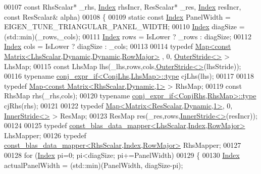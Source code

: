 \begin{DoxyCode}
00107         \textcolor{keyword}{const} RhsScalar* \_rhs, \hyperlink{namespace_eigen_a62e77e0933482dafde8fe197d9a2cfde}{Index} rhsIncr, ResScalar* \_res, \hyperlink{namespace_eigen_a62e77e0933482dafde8fe197d9a2cfde}{Index} resIncr, \textcolor{keyword}{const} ResScalar& 
      alpha)
00108   \{
00109     \textcolor{keyword}{static} \textcolor{keyword}{const} \hyperlink{namespace_eigen_a62e77e0933482dafde8fe197d9a2cfde}{Index} PanelWidth = EIGEN\_TUNE\_TRIANGULAR\_PANEL\_WIDTH;
00110     \hyperlink{namespace_eigen_a62e77e0933482dafde8fe197d9a2cfde}{Index} diagSize = (std::min)(\_rows,\_cols);
00111     \hyperlink{namespace_eigen_a62e77e0933482dafde8fe197d9a2cfde}{Index} rows = IsLower ? \_rows : diagSize;
00112     \hyperlink{namespace_eigen_a62e77e0933482dafde8fe197d9a2cfde}{Index} cols = IsLower ? diagSize : \_cols;
00113 
00114     \textcolor{keyword}{typedef} \hyperlink{group___core___module_class_eigen_1_1_map}{Map<const Matrix<LhsScalar,Dynamic,Dynamic,RowMajor>}
      , 0, \hyperlink{class_eigen_1_1_outer_stride}{OuterStride<>} > LhsMap;
00115     \textcolor{keyword}{const} LhsMap lhs(\_lhs,rows,cols,\hyperlink{class_eigen_1_1_outer_stride}{OuterStride<>}(lhsStride));
00116     \textcolor{keyword}{typename} \hyperlink{group___sparse_core___module}{conj\_expr\_if<ConjLhs,LhsMap>::type} cjLhs(lhs);
00117 
00118     \textcolor{keyword}{typedef} \hyperlink{group___core___module_class_eigen_1_1_map}{Map<const Matrix<RhsScalar,Dynamic,1>} > RhsMap;
00119     \textcolor{keyword}{const} RhsMap rhs(\_rhs,cols);
00120     \textcolor{keyword}{typename} \hyperlink{group___sparse_core___module}{conj\_expr\_if<ConjRhs,RhsMap>::type} cjRhs(rhs);
00121 
00122     \textcolor{keyword}{typedef} \hyperlink{group___core___module_class_eigen_1_1_map}{Map<Matrix<ResScalar,Dynamic,1>}, 0, 
      \hyperlink{class_eigen_1_1_inner_stride}{InnerStride<>} > ResMap;
00123     ResMap res(\_res,rows,\hyperlink{class_eigen_1_1_inner_stride}{InnerStride<>}(resIncr));
00124 
00125     \textcolor{keyword}{typedef} \hyperlink{class_eigen_1_1internal_1_1const__blas__data__mapper}{const\_blas\_data\_mapper<LhsScalar,Index,RowMajor>}
       LhsMapper;
00126     \textcolor{keyword}{typedef} \hyperlink{class_eigen_1_1internal_1_1const__blas__data__mapper}{const\_blas\_data\_mapper<RhsScalar,Index,RowMajor>}
       RhsMapper;
00127 
00128     \textcolor{keywordflow}{for} (\hyperlink{namespace_eigen_a62e77e0933482dafde8fe197d9a2cfde}{Index} pi=0; pi<diagSize; pi+=PanelWidth)
00129     \{
00130       \hyperlink{namespace_eigen_a62e77e0933482dafde8fe197d9a2cfde}{Index} actualPanelWidth = (std::min)(PanelWidth, diagSize-pi);

\end{DoxyCode}
